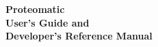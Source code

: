 \documentclass[10pt,twoside]{report}
\renewcommand{\headrulewidth}{0.25pt}
\renewcommand{\headrulewidth}{0pt}
\begin{document}
\pagestyle{empty}
\begin{titlepage}
\begin{center}
\vspace*{2cm}
\normalfont\noindent\bf\Huge{Proteomatic}  \\
\vspace*{0.5cm}
\normalfont
\Large{User's Guide and} \\
\Large{Developer's Reference Manual}

\vfill

\normalfont\noindent\large{}
\end{center}
\end{titlepage}

\cleartoevenpage
\setcounter{page}{2}
\setcounter{tocdepth}{1}
\setcounter{secnumdepth}{2}
\tableofcontents
\newpage

\thispagestyle{empty}

\pagestyle{fancy}

 {
  \renewcommand{\headrulewidth}{0.25pt}
  \fancyhf{}
  \fancyhead[EL,OR]{\thepage}
}
\end{document}
